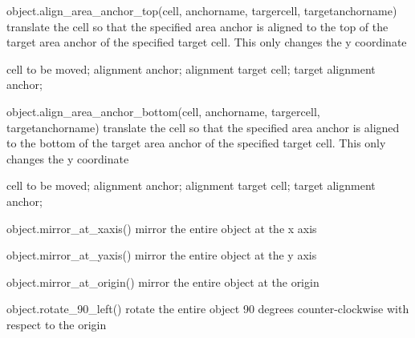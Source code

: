 \begin{APIfunc}{object.align\_area\_anchor\_top(cell, anchorname, targercell, targetanchorname)}
    translate the cell so that the specified area anchor is aligned to the top of the target area anchor of the specified target cell. This only changes the y coordinate
    \begin{APIparameters}
            cell to be moved;
            alignment anchor;
            alignment target cell;
            target alignment anchor;
    \end{APIparameters}
\end{APIfunc}
\begin{APIfunc}{object.align\_area\_anchor\_bottom(cell, anchorname, targercell, targetanchorname)}
    translate the cell so that the specified area anchor is aligned to the bottom of the target area anchor of the specified target cell. This only changes the y coordinate
    \begin{APIparameters}
            cell to be moved;
            alignment anchor;
            alignment target cell;
            target alignment anchor;
    \end{APIparameters}
\end{APIfunc}
\begin{APIfunc}{object.mirror\_at\_xaxis()}
    mirror the entire object at the x axis
    \begin{APIparameters}
    \end{APIparameters}
\end{APIfunc}
\begin{APIfunc}{object.mirror\_at\_yaxis()}
    mirror the entire object at the y axis
    \begin{APIparameters}
    \end{APIparameters}
\end{APIfunc}
\begin{APIfunc}{object.mirror\_at\_origin()}
    mirror the entire object at the origin
    \begin{APIparameters}
    \end{APIparameters}
\end{APIfunc}
\begin{APIfunc}{object.rotate\_90\_left()}
    rotate the entire object 90 degrees counter-clockwise with respect to the origin
    \begin{APIparameters}
    \end{APIparameters}
\end{APIfunc}
